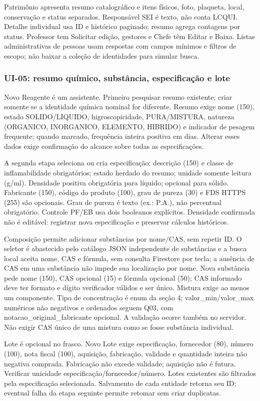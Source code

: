 Patrimônio apresenta resumo catalográfico e itens físicos, foto, plaqueta, local, conservação e status separados. Responsável SEI é texto, não conta LCQUI. Detalhe individual usa ID e histórico paginado; resumo agrega contagens por status. Professor tem Solicitar edição, gestores e Chefe têm Editar e Baixa. Listas administrativas de pessoas usam respostas com campos mínimos e filtros de escopo; não baixar a coleção de identidades para simular busca.

\subsubsection{UI-05: resumo químico, substância, especificação e lote}
Novo Reagente é um assistente. Primeiro pesquisar resumo existente; criar somente se a identidade química nominal for diferente. Resumo exige nome (150), estado SOLIDO/LIQUIDO, higroscopicidade, PURA/MISTURA, natureza (ORGANICO, INORGANICO, ELEMENTO, HIBRIDO) e indicador de pesagem frequente; quando marcado, frequência inteira positiva em dias. Alterar esses dados exige confirmação do alcance sobre todas as especificações.

A segunda etapa seleciona ou cria especificação: descrição (150) e classe de inflamabilidade obrigatórios; estado herdado do resumo; unidade somente leitura (g/ml). Densidade positiva obrigatória para líquido; opcional para sólido. Fabricante (150), código do produto (100), grau de pureza (30) e FDS HTTPS (255) são opcionais. Grau de pureza é texto (ex.: P.A.), não percentual obrigatório. Controle PF/EB usa dois booleanos explícitos. Densidade confirmada não é editável: registrar nova especificação e preservar cálculos históricos.

Composição permite adicionar substâncias por nome/CAS, sem repetir ID. O seletor é abastecido pelo catálogo JSON independente de substâncias e a busca local aceita nome, CAS e fórmula, sem consulta Firestore por tecla; a ausência de CAS em uma substância não impede sua localização por nome. Nova substância pede nome (150), CAS opcional (15) e fórmula opcional (50); CAS informado deve ter formato e dígito verificador válidos e ser único. Mistura exige ao menos um componente. Tipo de concentração é enum da seção 4; valor\_min/valor\_max numéricos não negativos e ordenados seguem Q03, com notacao\_original\_fabricante opcional. A validação ocorre também no servidor. Não exigir CAS único de uma mistura como se fosse substância individual.

Lote é opcional no frasco. Novo Lote exige especificação, fornecedor (80), número (100), nota fiscal (100), aquisição, fabricação, validade e quantidade inteira não negativa comprada. Fabricação não excede validade; aquisição não é futura. Verificar unicidade especificação/fornecedor/número. Lotes existentes são filtrados pela especificação selecionada. Salvamento de cada entidade retorna seu ID; eventual falha da etapa seguinte permite retomar sem criar duplicatas.

